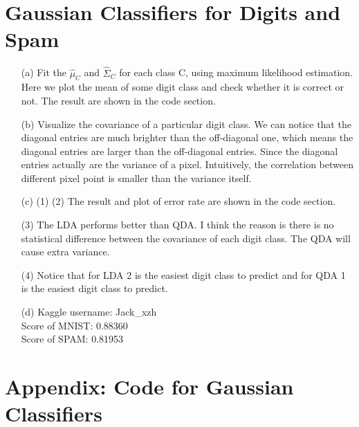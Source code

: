 \documentclass[a4paper,12pt]{article}
\begin{document}
\section{Gaussian Classifiers for Digits and Spam}
\begin{itemize}
\item[(a)]
Fit the $\hat \mu_C$ and $\hat \Sigma_C$ for each class C, using maximum likelihood estimation. Here we plot the mean of some digit class and check whether it is correct or not. The result are shown in the code section.

\item[(b)]
Visualize the covariance of a particular digit class. We can notice that the diagonal entries are much brighter than the off-diagonal one, which means the diagonal entries are larger than the off-diagonal entries. Since the diagonal entries actually are the variance of a pixel. Intuitively, the correlation between different pixel point is smaller than the variance itself.

\item[(c)]
\subitem (1) (2) The result and plot of error rate are shown in the code section.

\subitem (3) The LDA performs better than QDA. I think the reason is there is no statistical difference between the covariance of each digit class. The QDA will cause extra variance.

\subitem (4) Notice that for LDA 2 is the easiest digit class to predict and for QDA 1 is the easiest digit class to predict.

\item[(d)] Kaggle username: Jack\_xzh \\
Score of MNIST: 0.88360 \\
Score of SPAM: 0.81953 \\
\end{itemize}

\clearpage
\section{Appendix: Code for Gaussian Classifiers}
\end{document}
